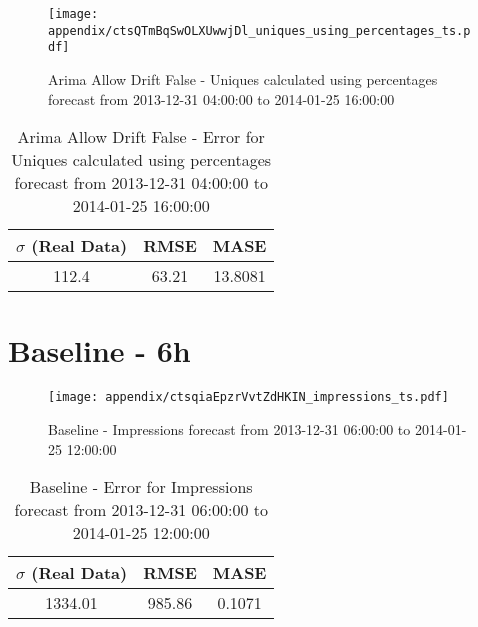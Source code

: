 \begin{figure}[H] \begin{center} \leavevmode
\texttt{[image: appendix/ctsQTmBqSwOLXUwwjDl\_uniques\_using\_percentages\_ts.pdf]} \caption{
Arima Allow Drift False - Uniques calculated using percentages forecast from 2013-12-31 04:00:00 to 2014-01-25 16:00:00} \label{fig:appendix/ctsQTmBqSwOLXUwwjDl_uniques_using_percentages_ts.pdf} \end{center}
\end{figure}

\begin{table}[H]
\centering
\footnotesize
\begin{tabular}{ccc}
$\sigma$ (Real Data) & RMSE & MASE   \\ \hline
112.4 & 63.21 & 13.8081 \\
\end{tabular}

\vspace{0.5cm}

\caption{
Arima Allow Drift False - Error for Uniques calculated using percentages forecast from 2013-12-31 04:00:00 to 2014-01-25 16:00:00}
\end{table}

\section{Baseline - 6h}
\begin{figure}[H] \begin{center} \leavevmode
\texttt{[image: appendix/ctsqiaEpzrVvtZdHKIN\_impressions\_ts.pdf]} \caption{
Baseline - Impressions forecast from 2013-12-31 06:00:00 to 2014-01-25 12:00:00} \label{fig:appendix/ctsqiaEpzrVvtZdHKIN_impressions_ts.pdf} \end{center}
\end{figure}

\begin{table}[H]
\centering
\footnotesize
\begin{tabular}{ccc}
$\sigma$ (Real Data) & RMSE & MASE   \\ \hline
1334.01 & 985.86 & 0.1071 \\
\end{tabular}

\vspace{0.5cm}

\caption{
Baseline - Error for Impressions forecast from 2013-12-31 06:00:00 to 2014-01-25 12:00:00}
\end{table}

